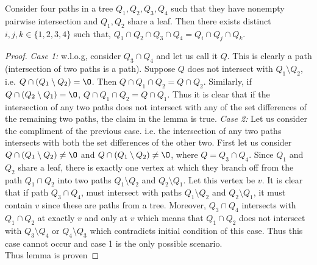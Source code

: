 \begin{lemma}
  \label{lem:fourpaths} Consider four paths in a tree $Q_1, Q_2, Q_3,
  Q_4$ such that they have nonempty pairwise intersection and $Q_1,
  Q_2$ share a leaf. Then there exists distinct $i, j, k \in
  \{1,2,3,4\}$ such that, $Q_1 \cap Q_2 \cap Q_3 \cap Q_4 = Q_i \cap
  Q_j \cap Q_k$.
\end{lemma}
\begin{proof}
  {\em Case 1:} w.l.o.g, consider $Q_3 \cap Q_4$ and let us call it
  $Q$. This is clearly a path (intersection of two paths is a path).
  Suppose $Q$ does not intersect with $Q_1 \setminus Q_2$, i.e. $Q
  \cap (Q_1 \setminus Q_2) = \O$. Then $Q \cap Q_1 \cap Q_2 = Q \cap
  Q_2$. Similarly, if $Q \cap (Q_2 \setminus Q_1) = \O$, $Q \cap Q_1
  \cap Q_2 = Q \cap Q_1$. Thus it is clear that if the intersection of
  any two paths does not intersect with any of the set differences of
  the remaining two paths, the claim in the lemma is true.
  {\em Case 2:} Let us consider the compliment of the previous
  case. i.e. the intersection of any two paths intersects with both
  the set differences of the other two. First let us consider $Q \cap
  (Q_1 \setminus Q_2) \ne \O$ and $Q \cap (Q_1 \setminus Q_2) \ne \O$,
  where $Q = Q_3 \cap Q_4$. Since $Q_1$ and $Q_2$ share a leaf, there
  is exactly one vertex at which they branch off from the path $Q_1
  \cap Q_2$ into two paths $Q_1 \setminus Q_2$ and $Q_2 \setminus
  Q_1$. Let this vertex be $v$. It is clear that if path $Q_3 \cap
  Q_4$, must intersect with paths $Q_1 \setminus Q_2$ and $Q_2
  \setminus Q_1$, it must contain $v$ since these are paths from a
  tree. Moreover, $Q_3 \cap Q_4$ intersects with $Q_1 \cap Q_2$ at
  exactly $v$ and only at $v$ which means that $Q_1 \cap Q_2$ does not
  intersect with $Q_3 \setminus Q_4$ or $Q_4 \setminus Q_3$ which
  contradicts initial condition of this case. Thus this
  case cannot occur and case 1 is the only possible scenario. \\
  Thus lemma is proven %
\end{proof}


